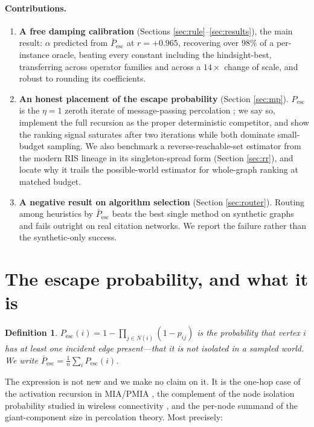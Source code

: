 \documentclass[11pt,a4paper]{article}
\newtheorem*{definitionstar}{Definition}
\newcommand{\Pesc}{P_{\mathrm{esc}}}
\newcommand{\Pescbar}{\bar{P}_{\mathrm{esc}}}
\begin{document}
\paragraph{Contributions.}
\begin{enumerate}[leftmargin=1.5em,itemsep=2pt]
\item \textbf{A free damping calibration} (Sections
\ref{sec:rule}--\ref{sec:results}), the main result: $\alpha$ predicted from
$\Pescbar$ at $r=+0.965$, recovering over $98\%$ of a per-instance oracle,
beating every constant including the hindsight-best, transferring across
operator families and across a $14\times$ change of scale, and robust to
rounding its coefficients.
\item \textbf{An honest placement of the escape probability} (Section
\ref{sec:mp}). $\Pesc$ is the $\eta=1$ zeroth iterate of message-passing
percolation \cite{knz14}; we say so, implement the full recursion as the proper
deterministic competitor, and show the ranking signal saturates after two
iterations while both dominate small-budget sampling. We also benchmark a
reverse-reachable-set estimator from the modern RIS lineage
\cite{borgs14,imm15,guo20,guo22} in its singleton-spread form (Section
\ref{sec:rr}), and locate why it trails the possible-world estimator for
whole-graph ranking at matched budget.
\item \textbf{A negative result on algorithm selection} (Section
\ref{sec:router}). Routing among heuristics by $\Pescbar$ beats the best single
method on synthetic graphs and fails outright on real citation networks. We
report the failure rather than the synthetic-only success.
\end{enumerate}

\section{The escape probability, and what it is}
\label{sec:pesc}

\begin{definitionstar}
$\Pesc(i)=1-\prod_{j\in N(i)}(1-p_{ij})$ is the probability that vertex $i$ has
at least one incident edge present---that it is not isolated in a sampled
world. We write $\Pescbar=\frac1n\sum_i\Pesc(i)$.
\end{definitionstar}

\noindent
The expression is not new and we make no claim on it. It is the one-hop case of
the activation recursion in MIA/PMIA \cite{pmia10}, the complement of the node
isolation probability studied in wireless connectivity \cite{takabe18}, and the
per-node summand of the giant-component size in percolation theory. Most
precisely:
\end{document}

